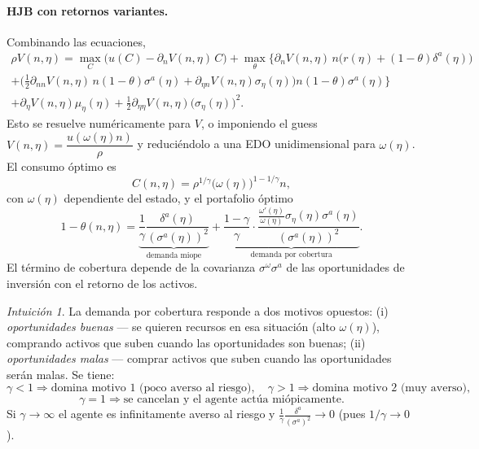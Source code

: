 \documentclass[11pt]{article}
\theoremstyle{definition}
\theoremstyle{remark}
\newtheorem*{intuicion}{Intuición}
\newcommand{\pV}[1]{\partial_{#1} V}
\begin{document}
\paragraph{HJB con retornos variantes.} Combinando las ecuaciones,
\begin{multline}\label{eq:hjb-tv}
\rho V(n,\eta)=\max_C\big(u(C)-\pV{n}(n,\eta)\,C\big)
+\max_\theta\Big\{\pV{n}(n,\eta)\,n\big(r(\eta)+(1-\theta)\delta^{a}(\eta)\big)\\
+\big(\tfrac12\pV{nn}(n,\eta)\,n(1-\theta)\sigma^{a}(\eta)+\pV{\eta n}(n,\eta)\sigma_\eta(\eta)\big)n(1-\theta)\sigma^{a}(\eta)\Big\}\\
+\pV{\eta}(n,\eta)\mu_\eta(\eta)+\tfrac12\pV{\eta\eta}(n,\eta)\big(\sigma_\eta(\eta)\big)^2.
\end{multline}
Esto se resuelve numéricamente para $V$, o imponiendo el guess $V(n,\eta)=\dfrac{u(\omega(\eta)n)}{\rho}$ y reduciéndolo a una EDO unidimensional para $\omega(\eta)$. El consumo óptimo es
\[
C(n,\eta)=\rho^{1/\gamma}\big(\omega(\eta)\big)^{1-1/\gamma}n,
\]
con $\omega(\eta)$ dependiente del estado, y el portafolio óptimo
\begin{equation}\label{eq:portfolio-hedge}
1-\theta(n,\eta)=\underbrace{\frac{1}{\gamma}\frac{\delta^{a}(\eta)}{(\sigma^{a}(\eta))^2}}_{\text{demanda miope}}
+\underbrace{\frac{1-\gamma}{\gamma}\cdot\frac{\tfrac{\omega'(\eta)}{\omega(\eta)}\sigma_\eta(\eta)\sigma^{a}(\eta)}{(\sigma^{a}(\eta))^2}}_{\text{demanda por cobertura}}.
\end{equation}
El término de cobertura depende de la covarianza $\sigma^{\omega}\sigma^{a}$ de las oportunidades de inversión con el retorno de los activos.

\begin{intuicion}
La demanda por cobertura responde a dos motivos opuestos: (i) \emph{oportunidades buenas} — se quieren recursos en esa situación (alto $\omega(\eta)$), comprando activos que suben cuando las oportunidades son buenas; (ii) \emph{oportunidades malas} — comprar activos que suben cuando las oportunidades serán malas. Se tiene:
\[
\gamma<1\Rightarrow\text{domina motivo 1 (poco averso al riesgo)},\quad
\gamma>1\Rightarrow\text{domina motivo 2 (muy averso)},
\]
\[
\gamma=1\Rightarrow\text{se cancelan y el agente actúa miópicamente.}
\]
Si $\gamma\to\infty$ el agente es infinitamente averso al riesgo y $\tfrac{1}{\gamma}\tfrac{\delta^{a}}{(\sigma^{a})^2}\to0$ (pues $1/\gamma\to0$).
\end{intuicion}

\end{document}
